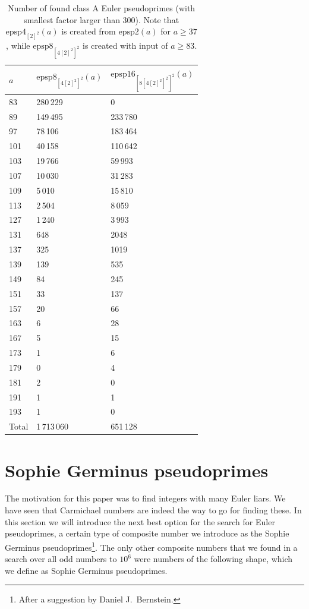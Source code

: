 \documentclass[runningheads]{amsart}
\newcommand{\epsp}{\mathrm{epsp}}
\begin{document}
\begin{table}[ht]
{\centering
\captionsetup{width=6cm}
\begin{tabular}{R{0.67cm}|R{2.2cm}|R{2cm}}
$a$
&
$\epsp8_{[4[2]^2]^2}(a)$
&
$\epsp16_{[8[4[2]^2]^2]^2}(a)$
  \\
 &
280\,229
&
0
\\
89
 &
149\,495&
233\,780\\
97
 &
78\,106&
183\,464
\\
101
&
40\,158
&
110\,642
\\
103
&
19\,766
&
59\,993\\
107
&
10\,030
&
31\,283
\\
109
&
5\,010
&
15\,810\\
113
&
2\,504
&
8\,059\\
127
&
1\,240&
3\,993\\
131
&
648
&
2048\\
137
&
325
&
1019\\
139
&
139
&
535
\\
149
&
84
 &
245\\
151
&
33
 &
137\\
157
&
20
 &
66\\
163
&
6
&
28\\
167
&
5
&
15\\
173
&
1
&
6\\
179
&
0
&
4\\
181
&
2
&
0\\
191
&
1
&
1\\
193
&
1
&
0\\
\hline
Total
&
1\,713\,060
&
651\,128
\\
\end{tabular}
\caption{Number of found class A Euler pseudoprimes (with smallest factor larger than 300). Note that  $\epsp4_{[2]^2}(a)$ is created from $\epsp2(a)$ for $a \geq 37$, while $\epsp8_{[4[2]^2]^2}$ is created with input of $a \geq 83$.}
\label{tab:epsp_numbers_300}
}
\end{table}


\relax
\section{Sophie Germinus pseudoprimes}\label{app:anonymous}
The motivation for this paper was to find integers with many Euler liars.
We have seen that Carmichael numbers are indeed the way to go for finding these.
In this section we will introduce the next best option for the search for Euler pseudoprimes,
a certain type of composite number we introduce as the Sophie Germinus
pseudoprimes\footnote{After
a suggestion by Daniel
J.\ Bernstein.}.
\relax
The only other composite numbers that we found in a search over all odd numbers to
$10^6$
were numbers of the following shape,
which we define as Sophie Germinus pseudoprimes.
\end{document}
